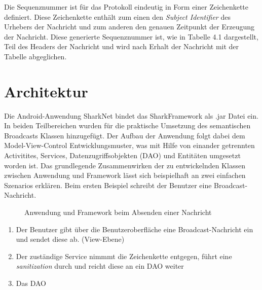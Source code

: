 Die Sequenznummer ist für das Protokoll eindeutig in Form einer Zeichenkette definiert. Diese Zeichenkette enthält zum einen den \textit{Subject Identifier} des Urhebers der Nachricht und zum anderen den genauen Zeitpunkt der Erzeugung der Nachricht. Diese generierte Sequenznummer ist, wie in Tabelle 4.1 dargestellt, Teil des Headers der Nachricht und wird nach Erhalt der Nachricht mit der Tabelle abgeglichen. 
\section{Architektur}
Die Android-Anwendung SharkNet bindet das SharkFramework als .jar Datei ein. In beiden Teilbereichen wurden für die praktische Umsetzung des semantischen Broadcasts Klassen hinzugefügt. Der Aufbau der Anwendung folgt dabei dem Model-View-Control Entwicklungsmuster, was mit Hilfe von einander getrennten Activitites, Services, Datenzugriffsobjekten (DAO) und Entitäten umgesetzt worden ist. Das grundlegende Zusammenwirken der zu entwickelnden Klassen zwischen Anwendung und Framework lässt sich beispielhaft an zwei einfachen Szenarios erklären. Beim ersten Beispiel schreibt der Benutzer eine Broadcast-Nachricht.
\begin{figure}[H]
	\centering
	\hspace*{1cm}
	\caption{Anwendung und Framework beim Absenden einer Nachricht}
	\label{fig:empfangNachrichtStruktur}
\end{figure}
\begin{enumerate}
	\item Der Benutzer gibt über die Benutzeroberfläche eine Broadcast-Nachricht ein und sendet diese ab. (View-Ebene)
	\item Der zuständige Service nimmmt die Zeichenkette entgegen, führt eine \textit{sanitization} durch und reicht diese an ein DAO weiter
	\item Das DAO 
\end{enumerate}